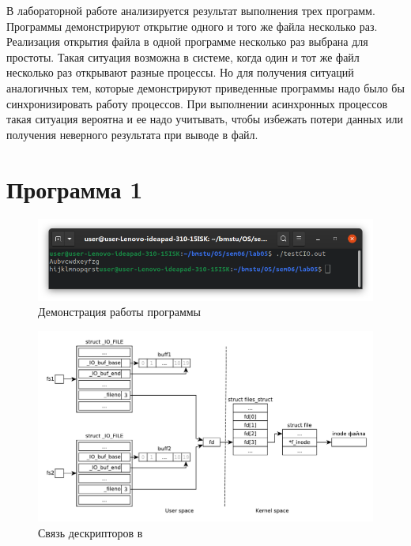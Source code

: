 \documentclass[a4paper,oneside,12pt]{extreport}
\begin{document}


\begin{task*}
	В лабораторной работе анализируется результат выполнения трех программ.
	Программы демонстрируют открытие одного и того же файла несколько раз.
	Реализация открытия файла в одной программе несколько раз выбрана для простоты.
	Такая ситуация возможна в системе, когда один и тот же файл несколько раз открывают разные процессы.
	Но для получения ситуаций аналогичных тем, которые демонстрируют приведенные программы надо было бы синхронизировать работу процессов.
	При выполнении асинхронных процессов такая ситуация вероятна и ее надо учитывать, чтобы избежать потери данных или получения неверного результата при выводе в файл.
\end{task*}

\section*{Программа 1}



\begin{figure}[H]
	\centering
	\includegraphics[width=\linewidth]{inc/img/testCIO-runtime}
	\caption{Демонстрация работы программы }
	\label{img:testCIO-runtime}
\end{figure}

\begin{figure}[H]
	\centering
	\includegraphics[scale=0.65]{inc/img/testCIO}
	\caption{Связь дескрипторов в }
	\label{img:testCIO}
\end{figure}
\end{document}
